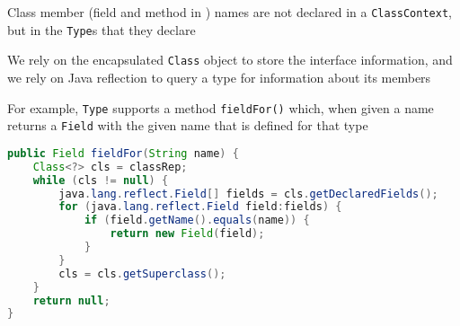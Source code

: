 \documentclass[8pt,a4paper,compress]{beamer}
\begin{document}
\begin{frame}[fragile]
\pause

Class member (field and method in \jmm) names are not declared in a \lstinline{ClassContext}, but in the \lstinline{Type}s that they declare

\pause
\bigskip

We rely on the encapsulated \lstinline{Class} object to store the interface information, and we rely on Java reflection to query a type for information about its members

\pause
\bigskip

For example, \lstinline{Type} supports a method \lstinline{fieldFor()} which, when given a name returns a \lstinline{Field} with the given name that is defined for that type

\begin{lstlisting}[language=Java,style=focusin]
public Field fieldFor(String name) {
    Class<?> cls = classRep;
    while (cls != null) {
        java.lang.reflect.Field[] fields = cls.getDeclaredFields();
        for (java.lang.reflect.Field field:fields) {
            if (field.getName().equals(name)) {
                return new Field(field);
            }
        }
        cls = cls.getSuperclass();
    }
    return null;
}
\end{lstlisting}
\end{frame}
\end{document}
